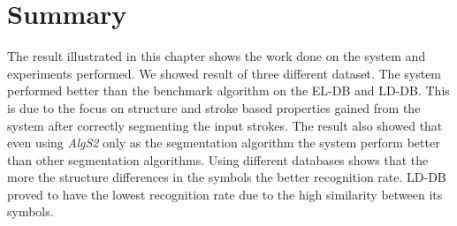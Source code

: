 %
%

 
\section{Summary}
\label{sec:ResultSummary}

The result illustrated in this chapter shows the work done on the system and experiments performed. We showed result of three different dataset. The system performed better than the benchmark algorithm on the EL-DB and LD-DB. This is due to the focus on structure and stroke based properties gained from the system after correctly segmenting the input strokes. The result also showed that even using \textsl{AlgS2} only as the segmentation algorithm the system perform better than other segmentation algorithms. Using different databases shows that the more the structure differences in the symbols the better recognition rate. LD-DB proved to have the lowest recognition rate due to the high similarity between its symbols.    %


